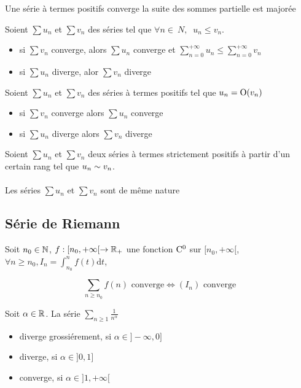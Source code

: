 \begin{prp}
Une série à termes positifs converge \ssi la suite des sommes partielle
est majorée
\end{prp}

\begin{prp}
Soient $\sum u_n$ et $\sum v_n$ des séries  tel que
$\forall n \in \ N, \;\; u_n \leq v_n$.

\begin{itemize}
    \item si $\sum v_n$ converge, alors $\sum u_n$ converge
        et $\sum^{+\infty}_{n = 0} u_n \leq \sum^{+\infty}_{n = 0} v_n$
    \item si $\sum u_n$ diverge, alor $\sum v_n$ diverge
\end{itemize}
\end{prp}

\begin{prp}
Soient $\sum u_n$ et $\sum v_n$ des séries à termes positifs tel que
$u_n = \operatorname*{O}(v_n)$

\begin{itemize}
    \item si $\sum v_n$ converge alors $\sum u_n$ converge
    \item si $\sum u_n$ diverge alors $\sum v_n$ diverge
\end{itemize}
\end{prp}

\begin{prp}
Soient $\sum u_n$ et $\sum v_n$ deux séries à termes strictement positifs
à partir d'un certain rang tel que $u_n \underset{}{\sim} v_n$.

Les séries $\sum u_n$ et $\sum v_n$ sont de même nature
\end{prp}

\subsection{Série de Riemann}

\begin{prp}
Soit $n_0 \in \mathbb{N}$, $f : [n_0, +\infty[ \to \mathbb{R}_+$ une fonction $\mathrm{C^{0}}$ sur
$[n_0, +\infty[$, $\forall n \geq n_0, I_n = \int^n_{n_0} f(t) \mathrm{d}t$,

\[
    \sum_{n \geq n_0} f(n) \text{ converge} \iff (I_n) \text{ converge}
\]
\end{prp}

\begin{prp}
Soit $\alpha \in \mathbb{R}$. La série $\sum_{n \geq 1} \frac{1}{n^\alpha}$
\begin{itemize}
    \item diverge grossiérement, si $\alpha \in ]-\infty, 0]$
    \item diverge, si $\alpha \in ]0, 1]$
    \item converge, si $\alpha \in ]1, +\infty[$
\end{itemize}
\end{prp}

